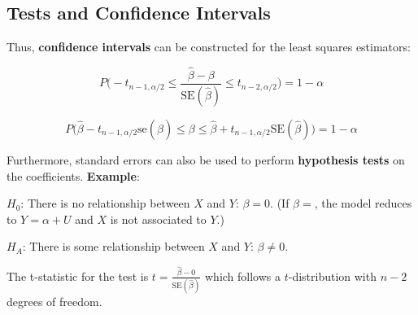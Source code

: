 \newpage

\subsection{Tests and Confidence Intervals}

\begin{paracol}{2}


	\switchcolumn

	Thus, \textbf{confidence intervals} can be constructed for the least squares estimators:

	$$P \Bigg( -t_{n-1, \alpha / 2} \leq \frac{\hat{\beta} - \beta}{\text{SE}(\hat{\beta})} \leq t_{n-2, \alpha / 2} \Bigg) = 1 - \alpha$$

	$$P \Bigg( \hat{\beta} - t_{n-1, \alpha / 2} \text{se}(\hat{\beta}) \leq \beta \leq \hat{\beta} + t_{n-1, \alpha / 2} \text{SE}(\hat{\beta}) \Bigg) = 1 - \alpha$$

\end{paracol}

Furthermore, standard errors can also be used to perform \textbf{hypothesis tests} on the coefficients. \textbf{Example}:

$H_0$: There is no relationship between $X$ and $Y$: $\beta = 0$. (If $\beta = $, the model reduces to $Y = \alpha + U$ and $X$ is not associated to $Y$.)

$H_A$: There is some relationship between $X$ and $Y$: $\beta \neq 0$.

The t-statistic for the test is $t = \frac{\hat{\beta} - 0}{\text{SE}(\hat{\beta})}$ which follows a $t$-distribution with $n - 2$ degrees of freedom.

